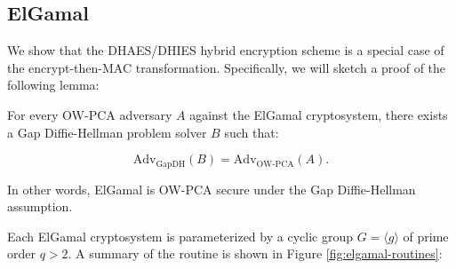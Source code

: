 \documentclass[runningheads]{llncs}
\begin{document}
\subsection{ElGamal}\label{sec:elgamal}
We show that the DHAES/DHIES hybrid encryption scheme is a special case of the encrypt-then-MAC transformation. Specifically, we will sketch a proof of the following lemma:

\begin{lemma}\label{lemma:elgamal-is-ow-pca}
    For every OW-PCA adversary $A$ against the ElGamal cryptosystem, there exists a Gap Diffie-Hellman problem solver $B$ such that:

    \begin{equation*}
        \text{Adv}_\text{GapDH}(B) = \text{Adv}_\text{OW-PCA}(A).
    \end{equation*}

    In other words, ElGamal is OW-PCA secure under the Gap Diffie-Hellman assumption.
\end{lemma}

Each ElGamal cryptosystem \cite{DBLP:journals/tit/Elgamal85} is parameterized by a cyclic group $G = \langle g \rangle$ of prime order $q > 2$. A summary of the routine is shown in Figure \ref{fig:elgamal-routines}:
\end{document}
